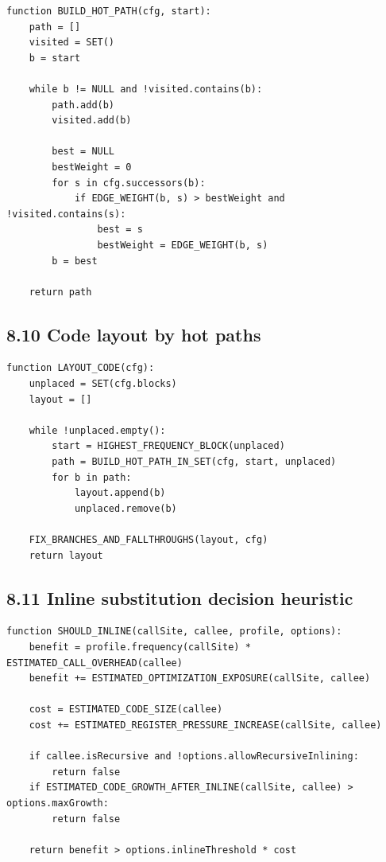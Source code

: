 \documentclass[10pt,letterpaper]{article}
\begin{document}
\begin{verbatim}
function BUILD_HOT_PATH(cfg, start):
    path = []
    visited = SET()
    b = start

    while b != NULL and !visited.contains(b):
        path.add(b)
        visited.add(b)

        best = NULL
        bestWeight = 0
        for s in cfg.successors(b):
            if EDGE_WEIGHT(b, s) > bestWeight and !visited.contains(s):
                best = s
                bestWeight = EDGE_WEIGHT(b, s)
        b = best

    return path
\end{verbatim}

\subsection*{8.10 Code layout by hot paths}

\begin{verbatim}
function LAYOUT_CODE(cfg):
    unplaced = SET(cfg.blocks)
    layout = []

    while !unplaced.empty():
        start = HIGHEST_FREQUENCY_BLOCK(unplaced)
        path = BUILD_HOT_PATH_IN_SET(cfg, start, unplaced)
        for b in path:
            layout.append(b)
            unplaced.remove(b)

    FIX_BRANCHES_AND_FALLTHROUGHS(layout, cfg)
    return layout
\end{verbatim}

\subsection*{8.11 Inline substitution decision heuristic}

\begin{verbatim}
function SHOULD_INLINE(callSite, callee, profile, options):
    benefit = profile.frequency(callSite) * ESTIMATED_CALL_OVERHEAD(callee)
    benefit += ESTIMATED_OPTIMIZATION_EXPOSURE(callSite, callee)

    cost = ESTIMATED_CODE_SIZE(callee)
    cost += ESTIMATED_REGISTER_PRESSURE_INCREASE(callSite, callee)

    if callee.isRecursive and !options.allowRecursiveInlining:
        return false
    if ESTIMATED_CODE_GROWTH_AFTER_INLINE(callSite, callee) > options.maxGrowth:
        return false

    return benefit > options.inlineThreshold * cost
\end{verbatim}
\end{document}
